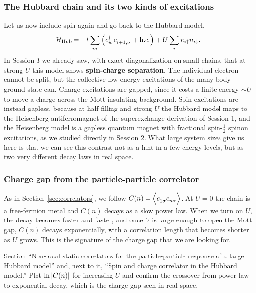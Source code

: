 \documentclass[lecture_notes.tex]{subfiles}
\begin{document}
\subsubsection{The Hubbard chain and its two kinds of excitations}
Let us now include spin again and go back to the Hubbard model,
\begin{equation}
  \Ham_{\mathrm{Hub}} = -t\sum_{i\sigma}\left(\cre{i\sigma}\ann{i+1,\sigma}+\mathrm{h.c.}\right)
    + U\sum_i n_{i\up}n_{i\dn}.
\end{equation}
In Session 3 we already saw, with exact diagonalization on small chains, that at strong $U$ this
model shows \textbf{spin-charge separation}. The individual electron cannot be split, but the
collective low-energy excitations of the many-body ground state can. Charge excitations are gapped,
since it costs a finite energy $\sim U$ to move a charge across the Mott-insulating background.
Spin excitations are instead gapless, because at half filling and strong $U$ the Hubbard model maps
to the Heisenberg antiferromagnet of the superexchange derivation of Session 1, and the Heisenberg
model is a gapless quantum magnet with fractional spin-$\tfrac12$ spinon excitations, as we studied
directly in Session 2. What large system sizes give us here is that we can see this contrast not as
a hint in a few energy levels, but as two very different decay laws in real space.

\subsubsection{Charge gap from the particle-particle correlator}
As in Section~\ref{sec:correlators}, we follow $C(n) = \expval{\cre{1\sigma}\ann{n\sigma}}$.
At $U=0$ the chain is a free-fermion metal and $C(n)$ decays as a slow power law. When we turn on
$U$, the decay becomes faster and faster, and once $U$ is large enough to open the Mott gap, $C(n)$
decays exponentially, with a correlation length that becomes shorter as $U$ grows. This is the
signature of the charge gap that we are looking for.

\begin{notebook}
Section ``Non-local static correlators for the particle-particle response of a large Hubbard
model'' and, next to it, ``Spin and charge correlator in the Hubbard model.'' Plot
$\ln\abs{C(n)}$ for increasing $U$ and confirm the crossover from power-law to exponential decay,
which is the charge gap seen in real space.
\end{notebook}
\end{document}
